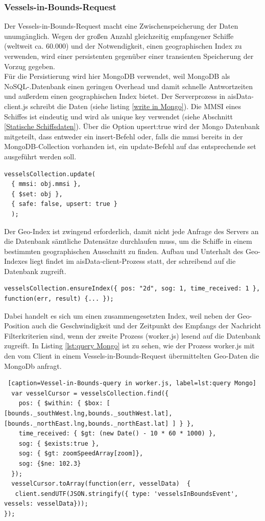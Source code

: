 \subsubsection{Vessels-in-Bounds-Request}\label{Vessels-in-Bounds-Request}
Der Vessels-in-Bounds-Request macht eine Zwischenspeicherung der Daten unumgänglich. Wegen der großen Anzahl gleichzeitig empfangener Schiffe (weltweit ca. 60.000) und der Notwendigkeit, einen geographischen Index zu verwenden, wird einer persistenten gegenüber einer transienten Speicherung der Vorzug gegeben. 
\\Für die Persistierung wird hier MongoDB verwendet, weil MongoDB als NoSQL-.Datenbank einen geringen Overhead und damit schnelle Antwortzeiten und außerdem einen geographischen Index bietet. Der Serverprozess in aisData-client.js schreibt die Daten (siehe listing \ref{write in Mongo}). Die MMSI eines Schiffes ist eindeutig und wird als unique key verwendet (siehe Abschnitt \ref{Statische Schiffsdaten}). Über die Option upsert:true wird der Mongo Datenbank mitgeteilt, dass entweder ein insert-Befehl oder, falls die mmsi bereits in der MongoDB-Collection vorhanden ist, ein update-Befehl auf das entsprechende set ausgeführt werden soll. 
\begin{lstlisting}[caption=Schreiben in die Datenbank in aisData-client.js, firstnumber=321, label=write in Mongo]
vesselsCollection.update(
  { mmsi: obj.mmsi },
  { $set: obj },
  { safe: false, upsert: true }
  );
\end{lstlisting}
Der Geo-Index ist zwingend erforderlich, damit nicht jede Anfrage des Servers an die Datenbank sämtliche Datensätze durchlaufen muss, um die Schiffe in einem bestimmten geographischen Ausschnitt zu finden. Aufbau und Unterhalt des Geo-Indexes liegt findet im aisData-client-Prozess statt, der schreibend auf die Datenbank zugreift.
\begin{lstlisting}[caption=Aufbau des Geo-Indexes in aisData-client.js]
  vesselsCollection.ensureIndex({ pos: "2d", sog: 1, time_received: 1 }, function(err, result) {... });
  \end{lstlisting}
Dabei handelt es sich um einen zusammengesetzten Index, weil neben der Geo-Position auch die Geschwindigkeit und der Zeitpunkt des Empfangs der Nachricht Filterkriterien sind, wenn der zweite Prozess (worker.js) lesend auf die Datenbank zugreift. In Listing \ref{lst:query Mongo} ist zu sehen, wie der Prozess worker.js mit den vom Client in einem Vessels-in-Bounds-Request übermittelten Geo-Daten die MongoDb anfragt.
  \begin{lstlisting} [caption=Vessel-in-Bounds-query in worker.js, label=lst:query Mongo]
  var vesselCursor = vesselsCollection.find({
    pos: { $within: { $box: [ [bounds._southWest.lng,bounds._southWest.lat], [bounds._northEast.lng,bounds._northEast.lat] ] } },
    time_received: { $gt: (new Date() - 10 * 60 * 1000) },
    sog: { $exists:true },
    sog: { $gt: zoomSpeedArray[zoom]},
    sog: {$ne: 102.3}
  });
  vesselCursor.toArray(function(err, vesselData)  {
   client.sendUTF(JSON.stringify({ type: 'vesselsInBoundsEvent', vessels: vesselData}));
});
\end{lstlisting}

